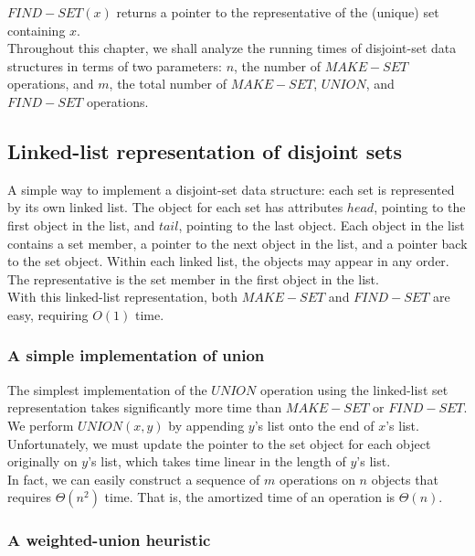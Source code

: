 \documentclass[12pt]{article}
\begin{document}
$FIND-SET(x)$ returns a pointer to the representative of the (unique) set containing $x$. \\

Throughout this chapter, we shall analyze the running times of disjoint-set data structures in terms of two parameters: $n$, the number of $MAKE-SET$ operations, and $m$, the total number of $MAKE-SET$, $UNION$, and $FIND-SET$ operations.

\subsection{Linked-list representation of disjoint sets}

A simple way to implement a disjoint-set data structure: each set is represented by its own linked list. The object for each set has attributes $head$, pointing to the first object in the list, and $tail$, pointing to the last object. Each object in the list contains a set member, a pointer to the next object in the list, and a pointer back to the set object. Within each linked list, the objects may appear in any order. The representative is the set member in the first object in the list. \\

With this linked-list representation, both $MAKE-SET$ and $FIND-SET$ are easy, requiring $O(1)$ time. \\

\subsubsection*{A simple implementation of union}

The simplest implementation of the $UNION$ operation using the linked-list set representation takes significantly more time than $MAKE-SET$ or $FIND-SET$. We perform $UNION(x,y)$ by appending $y$'s list onto the end of $x$'s list. Unfortunately, we must update the pointer to the set object for each object originally on $y$'s list, which takes time linear in the length of $y$'s list. \\

In fact, we can easily construct a sequence of $m$ operations on $n$ objects that requires $\Theta(n^2)$ time. That is, the amortized time of an operation is $\Theta(n)$.

\subsubsection*{A weighted-union heuristic}
\end{document}

